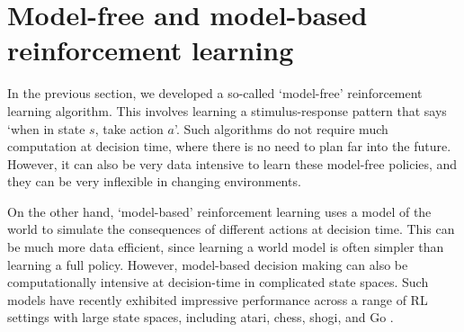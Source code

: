 \section{Model-free and model-based reinforcement learning}

In the previous section, we developed a so-called `model-free' reinforcement learning algorithm.
This involves learning a stimulus-response pattern that says `when in state $s$, take action $a$'.
Such algorithms do not require much computation at decision time, where there is no need to plan far into the future.
However, it can also be very data intensive to learn these model-free policies, and they can be very inflexible in changing environments.

On the other hand, `model-based' reinforcement learning uses a model of the world to simulate the consequences of different actions at decision time.
This can be much more data efficient, since learning a world model is often simpler than learning a full policy.
However, model-based decision making can also be computationally intensive at decision-time in complicated state spaces.
Such models have recently exhibited impressive performance across a range of RL settings with large state spaces, including atari, chess, shogi, and Go \citep{silver2018general, schrittwieser2020mastering}.

